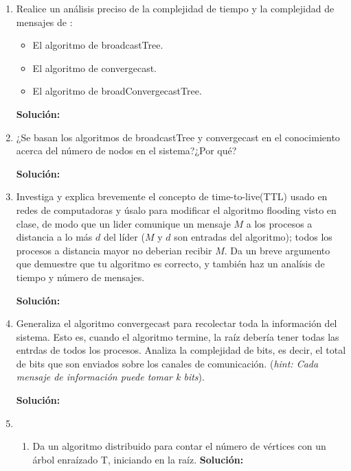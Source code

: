 \documentclass[8pt, letterpaper]{article}
\begin{document}
\begin{enumerate}
  \hfill\break
  \rmfamily
\item Realice un análisis preciso de la complejidad de tiempo y la complejidad
  de mensajes de :
  \begin{itemize}
  \item El algoritmo de broadcastTree.
  \item El algoritmo de convergecast.
  \item El algoritmo de broadConvergecastTree.
  \end{itemize}
  
  \hfill\break
  \ttfamily
 {\bf Solución:}

 \hfill\break
 \rmfamily
\item ¿Se basan los algoritmos de broadcastTree y convergecast en el
  conocimiento acerca del número de nodos en el sistema?¿Por qué?

  \hfill\break
  \ttfamily
  {\bf Solución:}
      
  \hfill\break
  \rmfamily
\item Investiga y explica brevemente el concepto de time-to-live(TTL) usado en
  redes de computadoras y úsalo para modificar el algoritmo flooding visto en
  clase, de modo que un lider comunique un mensaje $M$ a los procesos a
  distancia a lo más $d$ del líder ($M$ y $d$ son entradas del algoritmo);
  todos los procesos a distancia mayor no deberian recibir $M$. Da un breve
  argumento que demuestre que tu algoritmo es correcto, y también haz un
  analísis de tiempo y número de mensajes.

  \hfill\break
  \ttfamily
  {\bf Solución:}

  \hfill\break
  \rmfamily
\item Generaliza el algoritmo convergecast para recolectar toda la información
  del sistema. Esto es, cuando el algoritmo termine, la raíz debería tener
  todas las entrdas de todos los procesos. Analiza la complejidad de bits,
  es decir, el total de bits que son enviados sobre los canales de
  comunicación. (\textit{hint: Cada mensaje de información puede tomar k bits}).
  
  \hfill\break
  \ttfamily
  {\bf Solución:}

  \hfill\break
  \rmfamily
\item
  \begin{enumerate}
  \item Da un algoritmo distribuido para contar el número de vértices con
    un árbol enraízado T, iniciando en la raíz.
    \hfill\break
    \ttfamily
    {\bf Solución:}


\end{enumerate}
\end{enumerate}
\end{document}
